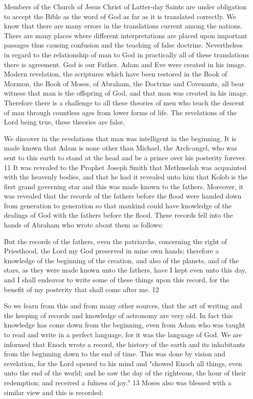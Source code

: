 Members of the Church of Jesus Christ of Latter-day Saints are under obligation to accept the
Bible as the word of God as far as it is translated correctly. We know that there are many
errors in the translations current among the nations. There are many places where different
interpretations are placed upon important passages thus causing confusion and the teaching
of false doctrine. Nevertheless in regard to the relationship of man to God in practically all of
these translations there is agreement. God is our Father. Adam and Eve were created in his
image. Modern revelation, the scriptures which have been restored in the Book of Mormon,
the Book of Moses, of Abraham, the Doctrine and Covenants, all bear witness that man is the
offspring of God, and that man was created in his image. Therefore there is a challenge to all
these theories of men who teach the descent of man through countless ages from lower forms
of life. The revelations of the Lord being true, these theories are false.

We discover in the revelations that man was intelligent in the beginning. It is made known
that Adam is none other than Michael, the Arch-angel, who was sent to this earth to stand at
the head and be a prince over his posterity forever. 11 It was revealed to the Prophet Joseph
Smith that Methuselah was acquainted with the heavenly bodies, and that he had it revealed
unto him that Kolob is the first grand governing star and this was made known to the fathers.
Moreover, it was revealed that the records of the fathers before the flood were handed down
from generation to generation so that mankind could have knowledge of the dealings of God
with the fathers before the flood. These records fell into the hands of Abraham who wrote
about them as follows:

But the records of the fathers, even the patriarchs, concerning the right of Priesthood, the
Lord my God preserved in mine own hands; therefore a knowledge of the beginning of the
creation, and also of the planets, and of the stars, as they were made known unto the fathers,
have I kept even unto this day, and I shall endeavor to write some of these things upon this
record, for the benefit of my posterity that shall come after me. 12

So we learn from this and from many other sources, that the art of writing and the keeping of
records and knowledge of astronomy are very old. In fact this knowledge has come down
from the beginning, even from Adam who was taught to read and write in a perfect language,
for it was the language of God. We are informed that Enoch wrote a record, the history of the
earth and its inhabitants from the beginning down to the end of time. This was done by vision
and revelation, for the Lord opened to his mind and "showed Enoch all things, even unto the
end of the world; and he saw the day of the righteous, the hour of their redemption; and
received a fulness of joy." 13 Moses also was blessed with a similar view and this is
recorded:

